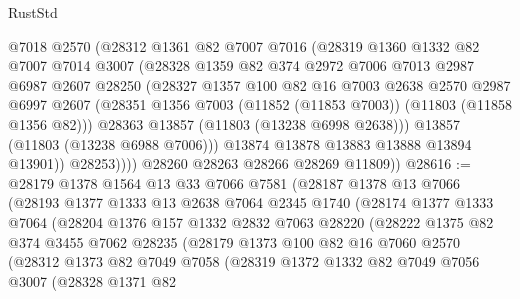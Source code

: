 \begin{lexlean}{RustStd}
\begin{coremodule}
                @7018
                @2570
                (@28312
                  @1361
                  @82
                  @7007
                  @7016
                  (@28319
                    @1360
                    @1332
                    @82
                    @7007
                    @7014
                    @3007
                    (@28328
                      @1359
                      @82
                      @374
                      @2972
                      @7006
                      @7013
                      @2987
                      @6987
                      @2607
                      @28250
                      (@28327
                        @1357
                        @100
                        @82
                        @16
                        @7003
                        @2638
                        @2570
                        @2987
                        @6997
                        @2607
                        (@28351 @1356 @7003 (@11852 (@11853 @7003)) (@11803 (@11858 @1356 @82)))
                        @28363
                        @13857
                        (@11803 (@13238 @6998 @2638)))
                      @13857
                      (@11803 (@13238 @6988 @7006)))
                    @13874
                    @13878
                    @13883
                    @13888
                    @13894
                    @13901))
                @28253))))
        @28260
        @28263
        @28266
        @28269
        @11809))
@28616 := @28179
    @1378
    @1564
    @13
    @33
    @7066
    @7581
    (@28187
      @1378
      @13
      @7066
      (@28193
        @1377
        @1333
        @13
        @2638
        @7064
        @2345
        @1740
        (@28174
          @1377
          @1333
          @7064
          (@28204
            @1376
            @157
            @1332
            @2832
            @7063
            @28220
            (@28222
              @1375
              @82
              @374
              @3455
              @7062
              @28235
              (@28179
                @1373
                @100
                @82
                @16
                @7060
                @2570
                (@28312
                  @1373
                  @82
                  @7049
                  @7058
                  (@28319
                    @1372
                    @1332
                    @82
                    @7049
                    @7056
                    @3007
                    (@28328
                      @1371
                      @82

\end{coremodule}
\end{lexlean}
